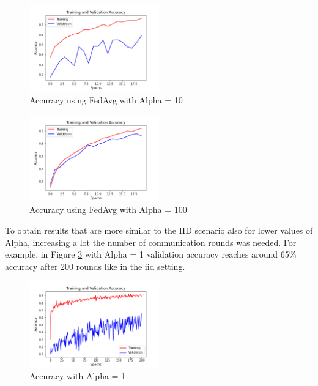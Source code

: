 \documentclass[twocolumn]{article}
\begin{document}
\begin{figure}
    \centering
    \includegraphics[width=0.5\textwidth,height=.3\textheight]{2_AccuracyFedAvg_A10.png}
    \caption{Accuracy using FedAvg with Alpha = 10}
     \label{AccFedAvgA10} 
\end{figure}

\begin{figure}
    \centering
    \includegraphics[width=0.5\textwidth,height=.3\textheight]{2_AccuracyFedAvg_A100.png}
    \caption{Accuracy using FedAvg with Alpha = 100}
     \label{AccFedAvgA100} 
\end{figure}

To obtain results that are more similar to the IID scenario also for lower values of Alpha, increasing a lot the number of communication rounds was needed. For example, in Figure \ref{AccA1R200} with Alpha = 1 validation accuracy reaches around 65\% accuracy after 200 rounds like in the iid setting.
\begin{figure}
    \centering
    \includegraphics[width=0.5\textwidth,height=.3\textheight]{3_AccuracyFedAvg_A1R200.png}
    \caption{Accuracy with Alpha = 1}
    \label{AccA1R200} 
\end{figure}
\end{document}
